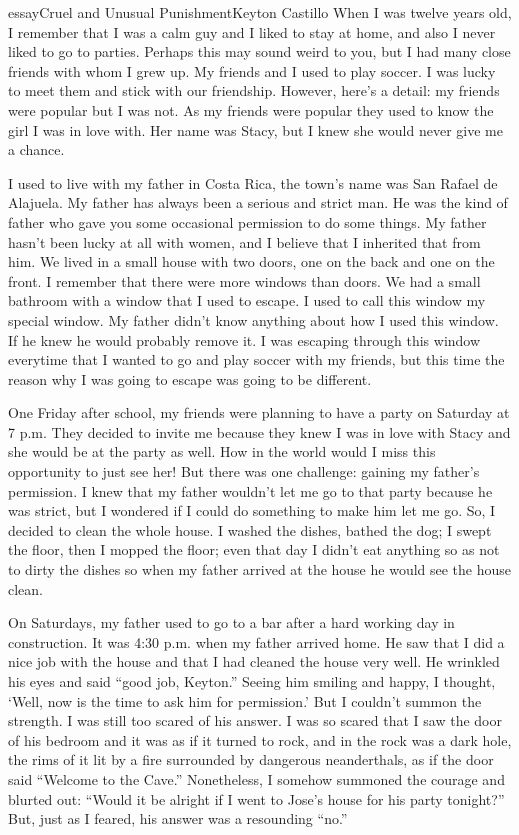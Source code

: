 \begin{prose}{essay}{Cruel and Unusual Punishment}{Keyton Castillo}
When I was twelve years old, I remember that I was a calm guy and I liked to stay at home, and also I never liked to go to parties. Perhaps this may sound weird to you, but I had many close friends with whom I grew up. My friends and  I used to play soccer.  I was lucky to meet them and stick with our friendship. However, here's a detail: my friends were popular but I was not. As my friends were popular they used to know the girl I was in love with. Her name was Stacy, but I knew she would never give me a chance.\par
I used to live with my father in Costa Rica, the town's name was San Rafael de Alajuela. My father has always been a serious and strict man. He was the kind of father who gave you some occasional permission to do some things. My father hasn't been lucky at all with women, and I believe that I inherited that from him. We lived in a small house with two doors, one on the back and one on the front. I remember that there were more windows than doors. We had a small bathroom with a window that I used to escape. I used to call this window my special window. My father didn't know anything about how I used this window. If he knew he would probably remove it. I was escaping through this window everytime that I wanted to go and play soccer with my friends, but this time the reason why I was going to escape was going to be different.\par
One Friday after school, my friends were planning to have a party on Saturday at 7 p.m. They decided to invite me because they knew I was in love with Stacy and she would be at the party as well. How in the world would I miss this opportunity to just see her! But there was one challenge: gaining my father's permission. I knew that my father wouldn't let me go to that party because he was strict, but I wondered if I could do something to make him let me go. So, I decided to clean the whole house. I washed the dishes, bathed the dog; I swept the floor, then I mopped the floor; even that day I didn't eat anything so as not to dirty the dishes so when my father arrived at the house he would see the house clean. \par
On Saturdays, my father used to go to a bar after a hard working day in construction. It was 4:30 p.m. when my father arrived home. He saw that I did a nice job with the house and that I had cleaned the house very well. He wrinkled his eyes and said “good job, Keyton.” Seeing him smiling and happy, I thought, `Well, now is the time to ask him for permission.' But I couldn't summon the strength. I was still too scared of his answer. I was so scared that I saw the door of his bedroom and it was as if it turned to rock, and in the rock was a dark hole, the rims of it lit by a fire surrounded by dangerous neanderthals, as if the door said “Welcome to the Cave.” Nonetheless, I somehow summoned the courage and blurted out: “Would it be alright if I went to Jose's house for his party tonight?” But, just as I feared, his answer was a resounding “no.” \par

\end{prose}
